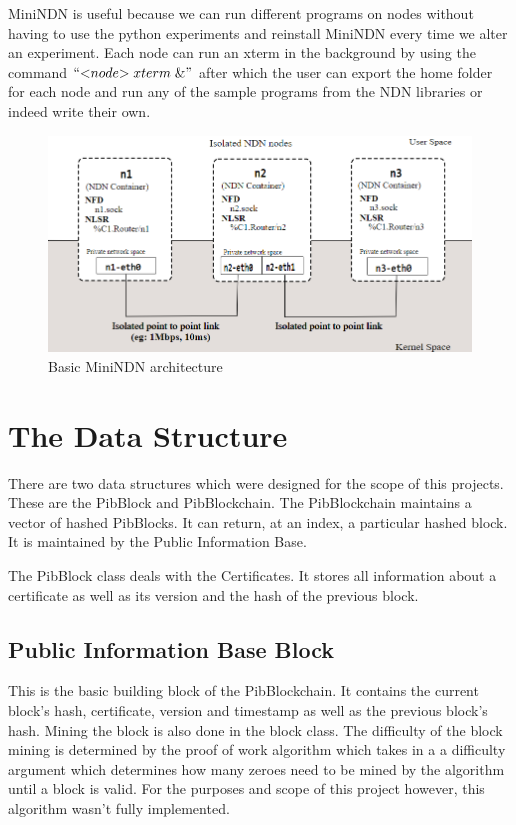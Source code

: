  MiniNDN is useful because we can run different programs on nodes without having to use the python experiments and reinstall MiniNDN every time we alter an experiment. Each node can run an xterm in the background by using the command $``{<}node{>} \; xterm \; \& "$ after which the user can export the home folder for each node and run any of the sample programs from the NDN libraries or indeed write their own. 
\begin{figure}

\includegraphics[width=6in]{minindn}
\caption{Basic MiniNDN architecture\cite{049}}
\end{figure}

\section{The Data Structure}
There are two data structures which were designed for the scope of this projects. These are the PibBlock and PibBlockchain. The PibBlockchain maintains a vector of hashed PibBlocks. It can return, at an index, a particular hashed block. It is maintained by the Public Information Base. 

The PibBlock class deals with the Certificates. It stores all information about a certificate as well as its version and the hash of the previous block.
\subsection{Public Information Base Block}
This is the basic building block of the PibBlockchain. It contains the current block's hash, certificate, version and timestamp as well as the previous block's hash. Mining the block is also done in the block class. The difficulty of the block mining is determined by the proof of work algorithm which takes in a a difficulty argument which determines how many zeroes need to be mined by the algorithm until a block is valid. For the purposes and scope of this project however, this algorithm wasn't fully implemented. 

